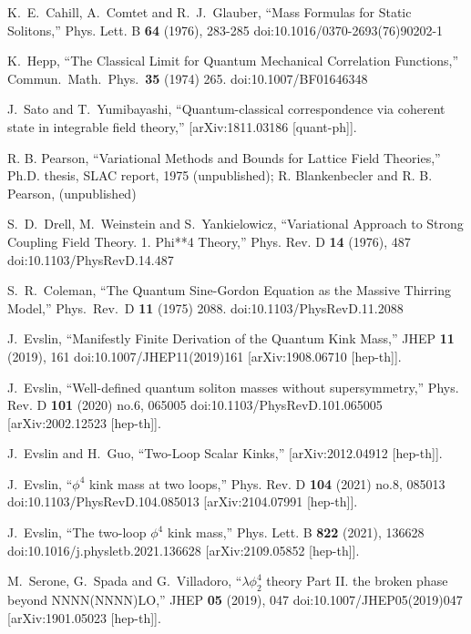 \def\letter{0}\def\pr{0}\documentclass[a4paper,12pt, epsfig]{article}
\renewcommand{\(}{\begin{equation}}
\renewcommand{\)}{end{equation} \vspace{-.05in}\linebreak}
\renewcommand{\=}{\hspace{-.03in}=\hspace{-.02in}}
\renewcommand{\(}{\begin{equation}}
\renewcommand{\)}{\end{equation}}
\renewcommand{\(}{\begin{equation}}
\renewcommand{\)}{\end{equation}}
\begin{document}
\begin{thebibliography}{99}
K.~E.~Cahill, A.~Comtet and R.~J.~Glauber,
``Mass Formulas for Static Solitons,''
Phys. Lett. B \textbf{64} (1976), 283-285
doi:10.1016/0370-2693(76)90202-1

  K.~Hepp,
  ``The Classical Limit for Quantum Mechanical Correlation Functions,''
  Commun.\ Math.\ Phys.\  {\bf 35} (1974) 265.
  doi:10.1007/BF01646348

J.~Sato and T.~Yumibayashi,
``Quantum-classical correspondence via coherent state in integrable field theory,''
[arXiv:1811.03186 [quant-ph]].

R. B. Pearson, 
``Variational Methods and Bounds for Lattice Field Theories,''
Ph.D. thesis, SLAC report, 1975 (unpublished); R. Blankenbecler and R. B. Pearson, (unpublished)


S.~D.~Drell, M.~Weinstein and S.~Yankielowicz,
``Variational Approach to Strong Coupling Field Theory. 1. Phi**4 Theory,''
Phys. Rev. D \textbf{14} (1976), 487
doi:10.1103/PhysRevD.14.487


  S.~R.~Coleman,
  ``The Quantum Sine-Gordon Equation as the Massive Thirring Model,''
  Phys.\ Rev.\ D {\bf 11} (1975) 2088.
  doi:10.1103/PhysRevD.11.2088


J.~Evslin,
``Manifestly Finite Derivation of the Quantum Kink Mass,''
JHEP \textbf{11} (2019), 161
doi:10.1007/JHEP11(2019)161
[arXiv:1908.06710 [hep-th]].

J.~Evslin,
``Well-defined quantum soliton masses without supersymmetry,''
Phys. Rev. D \textbf{101} (2020) no.6, 065005
doi:10.1103/PhysRevD.101.065005
[arXiv:2002.12523 [hep-th]].

J.~Evslin and H.~Guo,
``Two-Loop Scalar Kinks,''
[arXiv:2012.04912 [hep-th]].

J.~Evslin,
``\ensuremath{\phi^4} kink mass at two loops,''
Phys. Rev. D \textbf{104} (2021) no.8, 085013
doi:10.1103/PhysRevD.104.085013
[arXiv:2104.07991 [hep-th]].

J.~Evslin,
``The two-loop \ensuremath{\phi^4} kink mass,''
Phys. Lett. B \textbf{822} (2021), 136628
doi:10.1016/j.physletb.2021.136628
[arXiv:2109.05852 [hep-th]].

M.~Serone, G.~Spada and G.~Villadoro,
``$\lambda \phi_2^4$ theory \textemdash{} Part II. the broken phase beyond NNNN(NNNN)LO,''
JHEP \textbf{05} (2019), 047
doi:10.1007/JHEP05(2019)047
[arXiv:1901.05023 [hep-th]].


\end{thebibliography}
\end{document}
